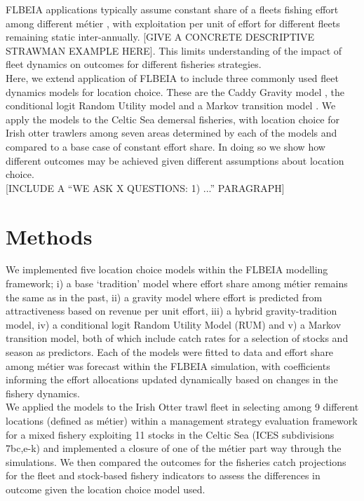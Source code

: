 \documentclass[12pt, halfline, a4paper]{ouparticle}
\begin{document}
FLBEIA applications typically assume constant share of a fleets fishing effort among
different métier \citep{Ulrich2016, Garcia2020}, with exploitation per unit of
effort for different fleets remaining static inter-annually. [GIVE A CONCRETE DESCRIPTIVE STRAWMAN EXAMPLE HERE]. This limits
understanding of the impact of fleet dynamics on outcomes for different
fisheries strategies. \\ 

Here, we extend application of FLBEIA to include three commonly used fleet
dynamics models for location choice. These are the Caddy Gravity model
\citep{Caddy1975}, the conditional logit Random Utility model
\citep{McFadden1973} and a Markov transition model \citep{Venables2009}. We
apply the models to the Celtic Sea demersal fisheries, with location choice for
Irish otter trawlers among seven areas determined by each of the models and
compared to a base case of constant effort share. In doing so we show how
different outcomes may be achieved given different assumptions about location
choice. \\

[INCLUDE A ``WE ASK X QUESTIONS: 1) ...'' PARAGRAPH]

\section{Methods}
\label{meth}

We implemented five location choice models within the FLBEIA modelling
framework; i) a base `tradition' model where effort share among métier remains
the same as in the past, ii) a gravity model where effort is predicted from
attractiveness based on revenue per unit effort, iii) a hybrid
gravity-tradition model, iv) a conditional logit Random Utility Model (RUM) and
v) a Markov transition model, both of which include catch rates for a selection
of stocks and season as predictors. Each of the models were fitted to data and
effort share among métier was forecast within the FLBEIA simulation, with
coefficients informing the effort allocations updated dynamically based on
changes in the fishery dynamics.  \\

We applied the models to the Irish Otter trawl fleet in selecting among 9
different locations (defined as métier) within a management strategy evaluation
framework for a mixed fishery exploiting 11 stocks in the Celtic Sea (ICES
subdivisions 7bc,e-k) and implemented a closure of one of the métier part way
through the simulations. We then compared the outcomes for the fisheries catch
projections for the fleet and stock-based fishery indicators to assess the
differences in outcome given the location choice model used.
\end{document}
